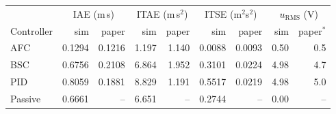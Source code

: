 \begin{tabular}{lrrrrrrrr}
\toprule
 & \multicolumn{2}{c}{IAE (m\,s)} & \multicolumn{2}{c}{ITAE (m\,s$^2$)} & \multicolumn{2}{c}{ITSE (m$^2$s$^2$)} & \multicolumn{2}{c}{$u_{\mathrm{RMS}}$ (V)}\\
Controller & sim & paper & sim & paper & sim & paper & sim & paper$^\ast$\\
\midrule
AFC & 0.1294 & 0.1216 & 1.197 & 1.140 & 0.0088 & 0.0093 & 0.50 & 0.5\\
BSC & 0.6756 & 0.2108 & 6.864 & 1.952 & 0.3101 & 0.0224 & 4.98 & 4.7\\
PID & 0.8059 & 0.1881 & 8.829 & 1.191 & 0.5517 & 0.0219 & 4.98 & 5.0\\
Passive & 0.6661 & -- & 6.651 & -- & 0.2744 & -- & 0.00 & --\\
\bottomrule
\end{tabular}
